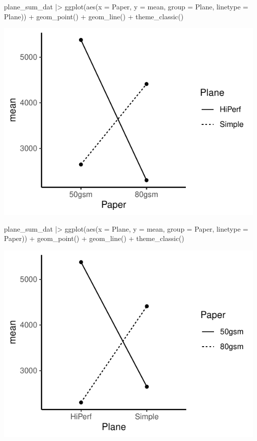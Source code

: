 \documentclass[a4paper]{article}
\begin{document}
\begin{minipage}[t]{0.49\textwidth}
\begin{Schunk}
\begin{Sinput}
plane_sum_dat |>
  ggplot(aes(x = Paper, y = mean,
             group = Plane, 
             linetype = Plane)) + 
  geom_point() +
  geom_line() + 
  theme_classic()
\end{Sinput}


{\centering \includegraphics[width=\maxwidth]{figure/listings-unnamed-chunk-322-1} 

}

\end{Schunk}
\end{minipage}
\hspace{0.02\textwidth}
\begin{minipage}[t]{0.49\textwidth}
\begin{Schunk}
\begin{Sinput}
plane_sum_dat |> 
  ggplot(aes(x = Plane, y = mean,
             group = Paper, 
             linetype = Paper)) + 
  geom_point() +
  geom_line() + 
  theme_classic()
\end{Sinput}


{\centering \includegraphics[width=\maxwidth]{figure/listings-unnamed-chunk-323-1} 

}

\end{Schunk}
\end{minipage}
\end{document}
